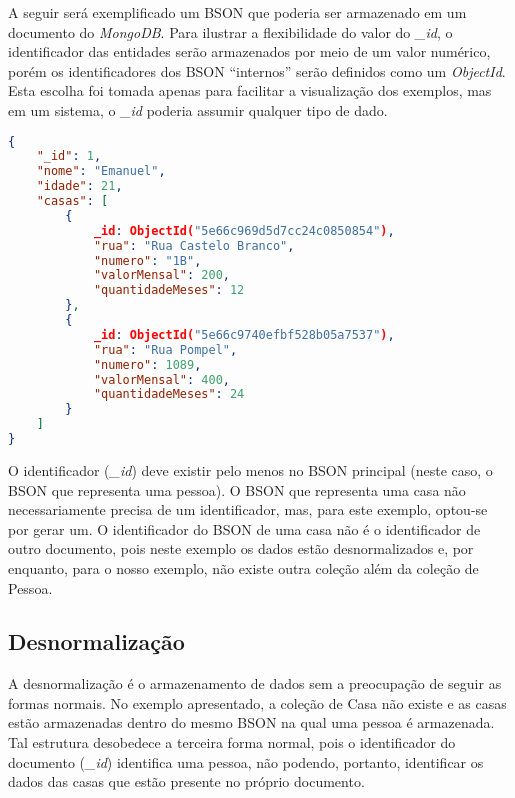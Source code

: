 
A seguir será exemplificado um BSON que poderia ser armazenado em um documento do \textit{MongoDB}. Para ilustrar a flexibilidade do valor do \textit{\_id}, o identificador das entidades serão armazenados por meio de um valor numérico, porém os identificadores dos BSON ``internos'' serão definidos como um \textit{ObjectId}. Esta escolha foi tomada apenas para facilitar a visualização dos exemplos, mas em um sistema, o \textit{\_id} poderia assumir qualquer tipo de dado.

\begin{lstlisting}[language=json, caption={Estrutura de Dados da Pessoa \textit{Emanuel}}]
{
    "_id": 1,
    "nome": "Emanuel",
    "idade": 21,
    "casas": [
        {
            _id: ObjectId("5e66c969d5d7cc24c0850854"),
            "rua": "Rua Castelo Branco",
            "numero": "1B",
            "valorMensal": 200,
            "quantidadeMeses": 12
        },
        {
            _id: ObjectId("5e66c9740efbf528b05a7537"),
            "rua": "Rua Pompel",
            "numero": 1089,
            "valorMensal": 400,
            "quantidadeMeses": 24
        }
    ]
}
\end{lstlisting}

O identificador (\textit{\_id}) deve existir pelo menos no BSON principal (neste caso, o BSON que representa uma pessoa). O BSON que representa uma casa não necessariamente precisa de um identificador, mas, para este exemplo, optou-se por gerar um. O identificador do BSON de uma casa não é o identificador de outro documento, pois neste exemplo os dados estão desnormalizados e, por enquanto, para o nosso exemplo, não existe outra coleção além da coleção de Pessoa.

\subsection{Desnormalização}

A desnormalização é o armazenamento de dados sem a preocupação de seguir as formas normais. No exemplo apresentado, a coleção de Casa não existe e as casas estão armazenadas dentro do mesmo BSON na qual uma pessoa é armazenada. Tal estrutura desobedece a terceira forma normal, pois o identificador do documento (\textit{\_id}) identifica uma pessoa, não podendo, portanto, identificar os dados das casas que estão presente no próprio documento.
    
